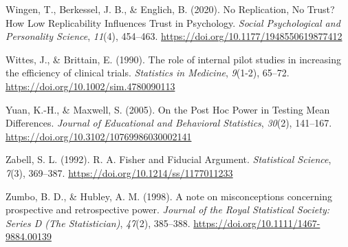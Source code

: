 \documentclass[
  letterpaper,
  DIV=11,
  numbers=noendperiod]{scrreprt}
\newlength{\cslhangindent}
\newlength{\cslentryspacingunit} %
\newenvironment{CSLReferences}[2] %
 {%
  \setlength{\parindent}{0pt}
  \ifodd #1
  \let\oldpar\par
  \def\par{\hangindent=\cslhangindent\oldpar}
  \fi
  \setlength{\parskip}{#2\cslentryspacingunit}
 }%
 {}
\begin{document}
\begin{CSLReferences}{1}{0}
\leavevmode{}%
Wingen, T., Berkessel, J. B., \& Englich, B. (2020). No {Replication},
{No Trust}? {How Low Replicability Influences Trust} in {Psychology}.
\emph{Social Psychological and Personality Science}, \emph{11}(4),
454--463. \url{https://doi.org/10.1177/1948550619877412}

\leavevmode{}%
Wittes, J., \& Brittain, E. (1990). The role of internal pilot studies
in increasing the efficiency of clinical trials. \emph{Statistics in
Medicine}, \emph{9}(1-2), 65--72.
\url{https://doi.org/10.1002/sim.4780090113}

\leavevmode{}%
Yuan, K.-H., \& Maxwell, S. (2005). On the {Post Hoc Power} in {Testing
Mean Differences}. \emph{Journal of Educational and Behavioral
Statistics}, \emph{30}(2), 141--167.
\url{https://doi.org/10.3102/10769986030002141}

\leavevmode{}%
Zabell, S. L. (1992). R. {A}. {Fisher} and {Fiducial Argument}.
\emph{Statistical Science}, \emph{7}(3), 369--387.
\url{https://doi.org/10.1214/ss/1177011233}

\leavevmode{}%
Zumbo, B. D., \& Hubley, A. M. (1998). A note on misconceptions
concerning prospective and retrospective power. \emph{Journal of the
Royal Statistical Society: Series D (The Statistician)}, \emph{47}(2),
385--388. \url{https://doi.org/10.1111/1467-9884.00139}

\end{CSLReferences}
\end{document}
